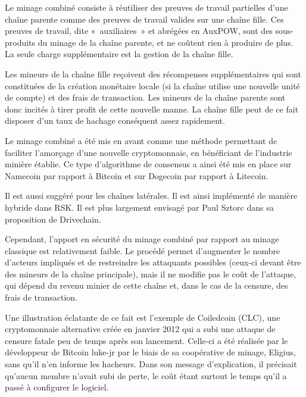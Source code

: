 Le minage combiné consiste à réutiliser des preuves de travail partielles d'une chaîne parente comme des preuves de travail valides sur une chaîne fille. Ces preuves de travail, dite «~auxiliaires~» et abrégées en AuxPOW, sont des sous-produits du minage de la chaîne parente, et ne coûtent rien à produire de plus. La seule charge supplémentaire est la gestion de la chaîne fille.

Les mineurs de la chaîne fille reçoivent des récompenses supplémentaires qui sont constituées de la création monétaire locale (si la chaîne utilise une nouvelle unité de compte) et des frais de transaction. Les mineurs de la chaîne parente sont donc incités à tirer profit de cette nouvelle manne. La chaîne fille peut de ce fait disposer d'un taux de hachage conséquent assez rapidement.

Le minage combiné a été mis en avant comme une méthode permettant de faciliter l'amorçage d'une nouvelle cryptomonnaie, en bénéficiant de l'industrie minière établie. Ce type d'algorithme de consensus a ainsi été mis en place sur Namecoin par rapport à Bitcoin et sur Dogecoin par rapport à Litecoin.

Il est aussi suggéré pour les chaînes latérales. Il est ainsi implémenté de manière hybride dans RSK. Il est plus largement envisagé par Paul Sztorc dans sa proposition de Drivechain.

Cependant, l'apport en sécurité du minage combiné par rapport au minage classique est relativement faible. Le procédé permet d'augmenter le nombre d'acteurs impliqués et de restreindre les attaquants possibles (ceux-ci devant être des mineurs de la chaîne principale), mais il ne modifie pas le coût de l'attaque, qui dépend du revenu minier de cette chaîne et, dans le cas de la censure, des frais de transaction.

Une illustration éclatante de ce fait est l'exemple de Coiledcoin (CLC), une cryptomonnaie alternative créée en janvier 2012 qui a subi une attaque de censure fatale peu de temps après son lancement. Celle-ci a été réalisée par le développeur de Bitcoin luke-jr par le biais de sa coopérative de minage, Eligius, sans qu'il n'en informe les hacheurs. Dans son message d'explication, il précisait qu'aucun membre n'avait subi de perte, le coût étant surtout le temps qu'il a passé à configurer le logiciel.

